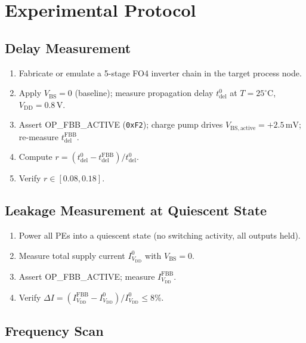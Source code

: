 \documentclass[12pt,a4paper]{report}
\theoremstyle{plain}
\theoremstyle{definition}
\theoremstyle{remark}
\newcommand{\opcode}[1]{\texttt{#1}}
\newcommand{\vbs}{V_{\mathrm{BS,active}}}
\newcommand{\vdd}{V_{\mathrm{DD}}}
\newcommand{\tdel}{t_{\mathrm{del}}}
\begin{document}
\section{Experimental Protocol}
\label{sec:protocol}

\subsection{Delay Measurement}

\begin{enumerate}[leftmargin=2em]
  \item Fabricate or emulate a 5-stage FO4 inverter chain in the target process node.
  \item Apply $V_{\mathrm{BS}} = 0$ (baseline); measure propagation delay $\tdel^{0}$ at
        $T = 25^{\circ}\mathrm{C}$, $\vdd = 0.8\,\mathrm{V}$.
  \item Assert OP\_FBB\_ACTIVE (\opcode{0xF2}); charge pump drives $\vbs = +2.5\,\mathrm{mV}$;
        re-measure $\tdel^{\mathrm{FBB}}$.
  \item Compute $r = (\tdel^{0} - \tdel^{\mathrm{FBB}}) / \tdel^{0}$.
  \item Verify $r \in [0.08, 0.18]$.
\end{enumerate}

\subsection{Leakage Measurement at Quiescent State}

\begin{enumerate}[leftmargin=2em]
  \item Power all PEs into a quiescent state (no switching activity, all outputs held).
  \item Measure total supply current $I_{\vdd}^{0}$ with $V_{\mathrm{BS}} = 0$.
  \item Assert OP\_FBB\_ACTIVE; measure $I_{\vdd}^{\mathrm{FBB}}$.
  \item Verify $\Delta I = (I_{\vdd}^{\mathrm{FBB}} - I_{\vdd}^{0}) / I_{\vdd}^{0} \leq 8\%$.
\end{enumerate}

\subsection{Frequency Scan}
\end{document}
